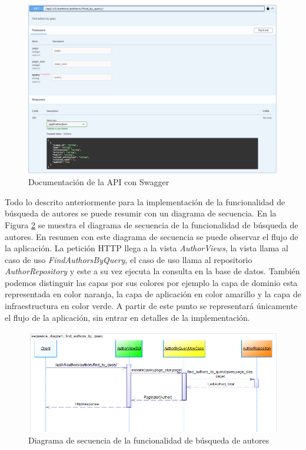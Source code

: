 \begin{figure}[H]
    \centering
    \includegraphics[scale=0.5]{../02Figures/02Chapter/Sprints/Sprint-3/swagger-ui.png}
    \caption{Documentación de la API con Swagger}
    \label{fig:swagger}
\end{figure}

Todo lo descrito anteriormente para la implementación de la funcionalidad de búsqueda de autores se puede resumir con un diagrama de secuencia.
En la Figura \ref{fig:sequence-diagram-authors-by-query} se muestra el diagrama de secuencia de la funcionalidad de búsqueda de autores.
En resumen con este diagrama de secuencia se puede observar el flujo de la aplicación. La petición HTTP llega a la vista \textit{AuthorViews}, la vista llama al caso de uso \textit{FindAuthorsByQuery}, el caso de uso llama al repositorio \textit{AuthorRepository} y este a su vez ejecuta la consulta en la base de datos.
También podemos distinguir las capas por sus colores por ejemplo la capa de dominio esta representada en color naranja, la capa de aplicación en color amarillo y la capa de infraestructura en color verde.
A partir de este punto se representará únicamente el flujo de la aplicación, sin entrar en detalles de la implementación.
\begin{figure}[H]
    \centering
    \includegraphics[scale=0.9]{../02Figures/02Chapter/Sprints/Sprint-4/sequence_diagram_find_authors_by_query.png}
    \caption{Diagrama de secuencia de la funcionalidad de búsqueda de autores}
    \label{fig:sequence-diagram-authors-by-query}
    
\end{figure}


